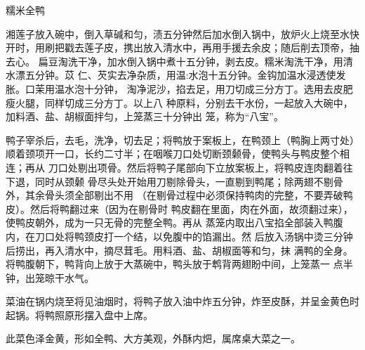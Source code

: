 \begin{recipe}[八宝全鸭]{糯米全鸭}

\ingredients


\preparation

\step 湘莲子放入碗中，倒入草碱和匀，渍五分钟然后加水倒入锅中，放炉火上烧至水快
开时，用刷把戳去莲子皮，携出放入清水中，再用手援去余皮；随后削去顶帝，抽去心。
扁豆淘洗干净，加水倒入锅中煮十五分钟，剥去皮。糯米淘洗干净，用清水漂五分钟。苡
仁、芡实去净杂质，用温:水泡十五分钟。金钩加温水浸透使发胀。口茉用温水泡十分钟，
淘净泥沙，掐去足，用刀切成三分方丁。选用去皮肥瘦火腿，同样切成三分方丁。以上八
种原料，分别去干水份，一起放入大碗中，加料酒、盐、胡椒面拌匀，上笼蒸三十分钟出
笼，称为“八宝”。

\step 鸭子宰杀后，去毛，洗净，切去足；将鸭放于案板上，在鸭颈上（鸭胸上两寸处）
顺着颈项开一口，长约二寸半；在咽喉刀口处切断颈颡骨，使鸭头与鸭皮整个相连；再从
刀口处剔出项骨。然后将鸭子尾部向下立放案板上，将鸭皮连肉翻着往下退，同时从颈颡
骨尽头处开始用刀剔除骨头，一直剔到鸭尾；除两翅不剔骨外，其余骨头须全部剔出不用
（在剔骨过程中必须保持鸭肉的完整，不要弄破鸭皮）。然后将鸭翻过来（因为在剔骨时
鸭皮翻在里面，肉在外面，故须翻过来），使鸭皮朝外，成为一只无骨的完整全鸭。再从
蒸笼内取出八宝掐全部装入鸭腹内，在刀口处将鸭颈皮打一个结，以免腹中的馅漏出。然
后放入汤锅中烫三分钟后捞出，再入清水中，摘尽茸毛。用料酒、盐、胡椒面等和匀，抹
满鸭的全身。将鸭腹朝下，鸭背向上放于大蒸碗中，鸭头放于鹎背两翅盼中间，上笼蒸一
点半钟，出笼晾干水气。

\step 菜油在锅内烧至将见油烟时，将鸭子放入油中炸五分钟，炸至皮酥，并呈金黄色时
起锅。将鸭照原形摆入盘中上席。

\features

此菜色泽金黄，形如全鸭、大方美观，外酥内𤆵，属席桌大菜之一。

\end{recipe}

